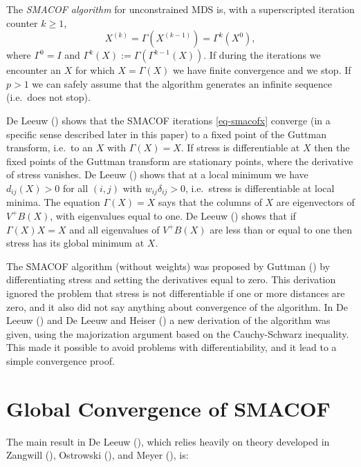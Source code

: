 \documentclass[
  12pt,
  letterpaper,
  DIV=11,
  numbers=noendperiod]{scrartcl}
\newcommand{\sectionbreak}{\clearpage}
\begin{document}
The \emph{SMACOF algorithm} for unconstrained MDS is, with a
superscripted iteration counter \(k\geq 1\), \begin{equation}
X^{(k)}=\Gamma(X^{(k-1)})=\Gamma^k(X^{0}),
\label{eq-smacofx}
\end{equation} where \(\Gamma^0=I\) and
\(\Gamma^k(X):=\Gamma(\Gamma^{k-1}(X))\). If during the iterations we
encounter an \(X\) for which \(X=\Gamma(X)\) we have finite convergence
and we stop. If \(p>1\) we can safely assume that the algorithm
generates an infinite sequence (i.e.~does not stop).

De Leeuw () shows that the SMACOF
iterations \eqref{eq-smacofx} converge (in a specific sense described
later in this paper) to a fixed point of the Guttman transform, i.e.~to
an \(X\) with \(\Gamma(X)=X\). If stress is differentiable at \(X\) then
the fixed points of the Guttman transform are stationary points, where
the derivative of stress vanishes. De Leeuw
() shows that at a local minimum we
have \(d_{ij}(X)>0\) for all \((i,j)\) with \(w_{ij}\delta_{ij}>0\),
i.e.~stress is differentiable at local minima. The equation
\(\Gamma(X)=X\) says that the columns of \(X\) are eigenvectors of
\(V^+B(X)\), with eigenvalues equal to one. De Leeuw
() shows that if \(\Gamma(X)X=X\) and
all eigenvalues of \(V^+B(X)\) are less than or equal to one then stress
has its global minimum at \(X\).

The SMACOF algorithm (without weights) was proposed by Guttman
() by differentiating stress and setting
the derivatives equal to zero. This derivation ignored the problem that
stress is not differentiable if one or more distances are zero, and it
also did not say anything about convergence of the algorithm. In De
Leeuw () and De Leeuw and Heiser
() a new derivation of the
algorithm was given, using the majorization argument based on the
Cauchy-Schwarz inequality. This made it possible to avoid problems with
differentiability, and it lead to a simple convergence proof.

\sectionbreak

\section{Global Convergence of
SMACOF}\label{global-convergence-of-smacof}

The main result in De Leeuw (), which
relies heavily on theory developed in Zangwill
(), Ostrowski
(), and Meyer
(), is:
\end{document}
